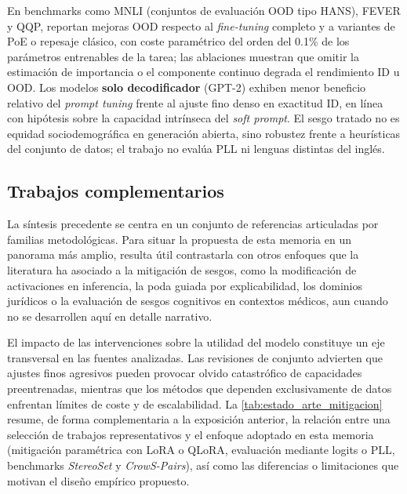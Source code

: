 \documentclass[12pt,a4paper]{report}
\begin{document}
En benchmarks como MNLI (conjuntos de evaluación OOD tipo HANS), FEVER y QQP, reportan mejoras OOD respecto al \textit{fine-tuning} completo y a variantes de PoE o repesaje clásico, con coste paramétrico del orden del 0.1\% de los parámetros entrenables de la tarea; las ablaciones muestran que omitir la estimación de importancia o el componente continuo degrada el rendimiento ID u OOD. Los modelos \textbf{solo decodificador} (GPT-2) exhiben menor beneficio relativo del \textit{prompt tuning} frente al ajuste fino denso en exactitud ID, en línea con hipótesis sobre la capacidad intrínseca del \textit{soft prompt}. El sesgo tratado no es equidad sociodemográfica en generación abierta, sino robustez frente a heurísticas del conjunto de datos; el trabajo no evalúa PLL ni lenguas distintas del inglés.

\subsection{Trabajos complementarios}
\label{subsec:estado_arte_tabla_comparativa}

La síntesis precedente se centra en un conjunto de referencias articuladas por familias metodológicas. Para situar la propuesta de esta memoria en un panorama más amplio, resulta útil contrastarla con otros enfoques que la literatura ha asociado a la mitigación de sesgos, como la modificación de activaciones en inferencia, la poda guiada por explicabilidad, los dominios jurídicos o la evaluación de sesgos cognitivos en contextos médicos, aun cuando no se desarrollen aquí en detalle narrativo.

El impacto de las intervenciones sobre la utilidad del modelo constituye un eje transversal en las fuentes analizadas. Las revisiones de conjunto \cite{lin_towards_2024} advierten que ajustes finos agresivos pueden provocar olvido catastrófico de capacidades preentrenadas, mientras que los métodos que dependen exclusivamente de datos enfrentan límites de coste y de escalabilidad. La \autoref{tab:estado_arte_mitigacion} resume, de forma complementaria a la exposición anterior, la relación entre una selección de trabajos representativos y el enfoque adoptado en esta memoria (mitigación paramétrica con LoRA o QLoRA, evaluación mediante logits o PLL, benchmarks \textit{StereoSet} y \textit{CrowS-Pairs}), así como las diferencias o limitaciones que motivan el diseño empírico propuesto.
\end{document}
